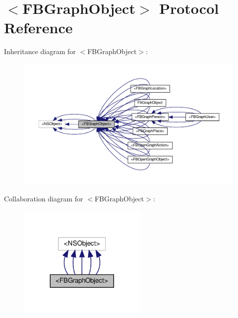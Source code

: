 \hypertarget{protocolFBGraphObject-p}{}\section{$<$F\+B\+Graph\+Object$>$ Protocol Reference}
\label{protocolFBGraphObject-p}


Inheritance diagram for $<$F\+B\+Graph\+Object$>$\+:
\nopagebreak
\begin{figure}[H]
\begin{center}
\leavevmode
\includegraphics[width=350pt]{protocolFBGraphObject-p__inherit__graph}
\end{center}
\end{figure}


Collaboration diagram for $<$F\+B\+Graph\+Object$>$\+:
\nopagebreak
\begin{figure}[H]
\begin{center}
\leavevmode
\includegraphics[width=176pt]{protocolFBGraphObject-p__coll__graph}
\end{center}
\end{figure}

